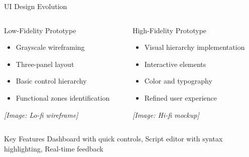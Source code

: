 \documentclass{beamer}
\begin{document}
\begin{frame}{UI Design Evolution}
\begin{columns}
\begin{column}{0.5\textwidth}
\begin{block}{Low-Fidelity Prototype}
\begin{itemize}
    \item Grayscale wireframing
    \item Three-panel layout
    \item Basic control hierarchy
    \item Functional zones identification
\end{itemize}
\textit{[Image: Lo-fi wireframe]}
\end{block}
\end{column}
\begin{column}{0.5\textwidth}
\begin{block}{High-Fidelity Prototype}
\begin{itemize}
    \item Visual hierarchy implementation
    \item Interactive elements
    \item Color and typography
    \item Refined user experience
\end{itemize}
\textit{[Image: Hi-fi mockup]}
\end{block}
\end{column}
\end{columns}

\begin{block}{Key Features}
Dashboard with quick controls, Script editor with syntax highlighting, Real-time feedback
\end{block}
\end{frame}
\end{document}
